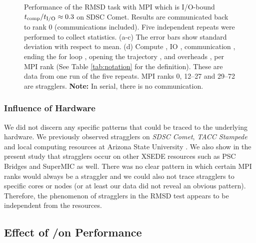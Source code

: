 \begin{figure}
\caption{Performance of the RMSD task with MPI which is I/O-bound ${t}_{\text{comp}}/{t}_{\text{I/O}} \approx 0.3$ on SDSC Comet.
Results are communicated back to rank 0 (communications included). Five independent repeats were performed to collect statistics. (a-c) The error bars show
standard deviation with respect to mean. (d) Compute \tcomp, IO \tIO, communication \tcomm, ending the for loop ,
  opening the trajectory , and overheads ,  per MPI rank (See Table \ref{tab:notation} for the definition).
These are data from one run of the five repeats. MPI ranks 0, 12--27 and 29--72 are stragglers. \textbf{Note:} In serial, there is no communication.}
\label{fig:MPIwithIO}
\end{figure} 

\subsubsection*{Influence of Hardware}
We did not discern any specific patterns that could be traced to the underlying hardware. 
We previously observed stragglers on \emph{SDSC Comet}, \emph{TACC Stampede} and local computing resources at Arizona State University \cite{Khoshlessan:2017ab}. 
We also show in the present study that stragglers occur on other XSEDE resources such as PSC Bridges and SuperMIC as well.
There was no clear pattern in which certain MPI ranks would always be a straggler and we could also not trace stragglers to specific cores or nodes (or at least our data did not reveal an obvious pattern). 
Therefore, the phenomenon of stragglers in the RMSD test appears to be independent from the resources.

\subsection{Effect of \tcomp/\tIO on Performance}
\label{bound}

